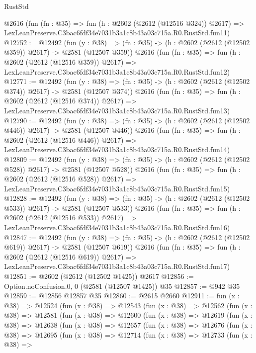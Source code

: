 \begin{lexlean}{RustStd}
\begin{coremodule}
    @2616
    (fun (fn : @35) =>
    fun (h : @2602 (@2612 (@12516 @324)) @2617) =>
    LexLeanPreserve.C3bac6fdf34e7031b3a1c8b43a03c715a.R0.RustStd.fun11)
@12752 := @12492
    (fun (y : @38) => (fn : @35) -> (h : @2602 (@2612 (@12502 @359)) @2617) -> @2581 (@12507 @359))
    @2616
    (fun (fn : @35) =>
    fun (h : @2602 (@2612 (@12516 @359)) @2617) =>
    LexLeanPreserve.C3bac6fdf34e7031b3a1c8b43a03c715a.R0.RustStd.fun12)
@12771 := @12492
    (fun (y : @38) => (fn : @35) -> (h : @2602 (@2612 (@12502 @374)) @2617) -> @2581 (@12507 @374))
    @2616
    (fun (fn : @35) =>
    fun (h : @2602 (@2612 (@12516 @374)) @2617) =>
    LexLeanPreserve.C3bac6fdf34e7031b3a1c8b43a03c715a.R0.RustStd.fun13)
@12790 := @12492
    (fun (y : @38) => (fn : @35) -> (h : @2602 (@2612 (@12502 @446)) @2617) -> @2581 (@12507 @446))
    @2616
    (fun (fn : @35) =>
    fun (h : @2602 (@2612 (@12516 @446)) @2617) =>
    LexLeanPreserve.C3bac6fdf34e7031b3a1c8b43a03c715a.R0.RustStd.fun14)
@12809 := @12492
    (fun (y : @38) => (fn : @35) -> (h : @2602 (@2612 (@12502 @528)) @2617) -> @2581 (@12507 @528))
    @2616
    (fun (fn : @35) =>
    fun (h : @2602 (@2612 (@12516 @528)) @2617) =>
    LexLeanPreserve.C3bac6fdf34e7031b3a1c8b43a03c715a.R0.RustStd.fun15)
@12828 := @12492
    (fun (y : @38) => (fn : @35) -> (h : @2602 (@2612 (@12502 @533)) @2617) -> @2581 (@12507 @533))
    @2616
    (fun (fn : @35) =>
    fun (h : @2602 (@2612 (@12516 @533)) @2617) =>
    LexLeanPreserve.C3bac6fdf34e7031b3a1c8b43a03c715a.R0.RustStd.fun16)
@12847 := @12492
    (fun (y : @38) => (fn : @35) -> (h : @2602 (@2612 (@12502 @619)) @2617) -> @2581 (@12507 @619))
    @2616
    (fun (fn : @35) =>
    fun (h : @2602 (@2612 (@12516 @619)) @2617) =>
    LexLeanPreserve.C3bac6fdf34e7031b3a1c8b43a03c715a.R0.RustStd.fun17)
@12851 := @2602 (@2612 (@12502 @1425)) @2617
@12856 := Option.noConfusion.{0, 0} (@2581 (@12507 @1425)) @35
@12857 := @942 @35
@12859 := @12856 @12857 @35
@12860 := @2615 @2660
@12911 := fun (x : @38) =>
  @12524
    (fun (x : @38) =>
    @12543
      (fun (x : @38) =>
      @12562
        (fun (x : @38) =>
        @12581
          (fun (x : @38) =>
          @12600
            (fun (x : @38) =>
            @12619
              (fun (x : @38) =>
              @12638
                (fun (x : @38) =>
                @12657
                  (fun (x : @38) =>
                  @12676
                    (fun (x : @38) =>
                    @12695
                      (fun (x : @38) =>
                      @12714
                        (fun (x : @38) =>
                        @12733
                          (fun (x : @38) =>

\end{coremodule}
\end{lexlean}
